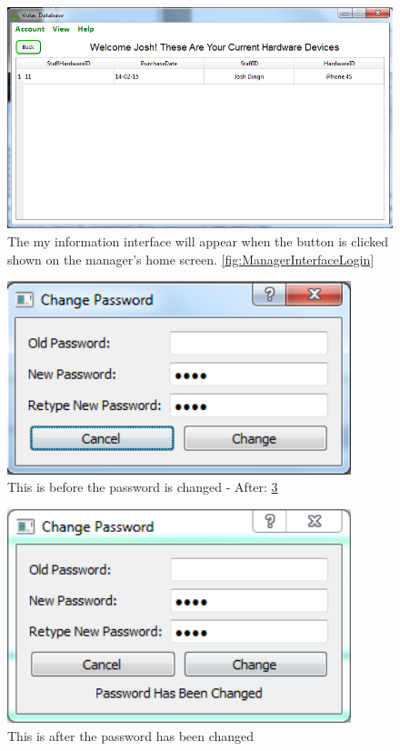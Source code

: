 \begin{figure}[H]
    \includegraphics[width=\textwidth]{./Testing/Images/MyInformation.png}
    \caption{The my information interface will appear when the button is clicked shown on the manager's home screen. \ref{fig:ManagerInterfaceLogin} } \label{fig:MyInformation}
\end{figure}

\begin{figure}[H]
    \includegraphics[width=100mm,scale=1]{./Testing/Images/ChangePasswordWindow.png}
    \caption{This is before the password is changed - After: \ref{fig:PassChange}} \label{fig:ChangePasswordWindow}
\end{figure}

\begin{figure}[H]
    \includegraphics[width=100mm,scale=1]{./Testing/Images/PassChange1.png}
    \caption{This is after the password has been changed} \label{fig:PassChange}
\end{figure}


